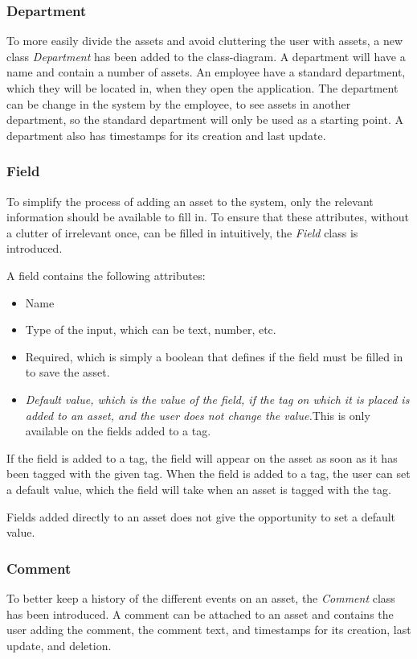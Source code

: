 \subsubsection{Department}
To more easily divide the assets and avoid cluttering the user with assets, a new class \textit{Department} has been added to the class-diagram. A department will have a name and contain a number of assets. An employee have a standard department, which they will be located in, when they open the application. The department can be change in the system by the employee, to see assets in another department, so the standard department will only be used as a starting point. A department also has timestamps for its creation and last update.

\subsubsection{Field}
To simplify the process of adding an asset to the system, only the relevant information should be available to fill in. To ensure that these attributes, without a clutter of irrelevant once, can be filled in intuitively, the \textit{Field} class is introduced.
\par
A field contains the following attributes:
\begin{itemize}
    \item Name
    \item Type of the input, which can be text, number, etc.
    \item Required, which is simply a boolean that defines if the field must be filled in to save the asset.
    \item \textit{Default value, which is the value of the field, if the tag on which it is placed is added to an asset, and the user does not change the value.}\newline This is only available on the fields added to a tag.
\end{itemize}
If the field is added to a tag, the field will appear on the asset as soon as it has been tagged with the given tag. When the field is added to a tag, the user can set a default value, which the field will take when an asset is tagged with the tag.
\par
Fields added directly to an asset does not give the opportunity to set a default value.

\subsubsection{Comment}
To better keep a history of the different events on an asset, the \textit{Comment} class has been introduced. A comment can be attached to an asset and contains the user adding the comment, the comment text, and timestamps for its creation, last update, and deletion.

